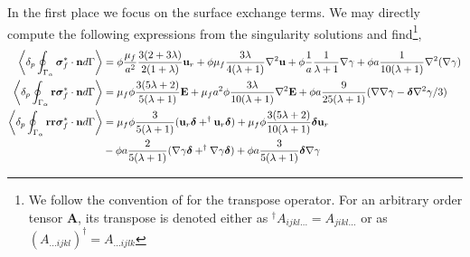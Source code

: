 In the first place we focus on the surface exchange terms. 
We may directly compute the following expressions from the singularity solutions and find\footnote{
    We follow the convention of \citet{happel2012low} for the transpose operator.
    For an arbitrary order tensor \textbf{A}, its transpose is denoted either as $^\dagger A_{ijkl\ldots} = A_{jikl\ldots}$ or as $ (A_{\ldots ijkl})^\dagger = A_{\ldots ijlk}$}, 
\begin{align}
    \pSavg{\bm\sigma_f^*\cdot \textbf{n}} &
    =
    \phi
    \frac{\mu_f}{a^2}
    \frac{3(2+3\lambda)}{2(1+\lambda)}\textbf{u}_r
    + \phi\mu_f  \frac{3\lambda}{4(\lambda +1)} \grad^2 \textbf{u}%
    + \phi \frac{1}{a}\frac{1}{\lambda +1} \grad \gamma
    + \phi a \frac{1}{10(\lambda +1)}\grad^2(\grad\gamma)
    \label{eq:drag_forces}
    \\
    \pSavg{\textbf{r}\bm\sigma_f^*\cdot \textbf{n}} &
    = \mu_f \phi 
    \frac{3(5\lambda +2)}{5(\lambda +1)}\textbf{E}
    + \mu_f a^2 \phi \frac{3\lambda}{10(\lambda+1)}\grad^2  \textbf{E}
    + \phi a \frac{9}{25(\lambda +1)}(\grad\grad \gamma- \bm\delta\grad^2 \gamma/3)
    \\
    \pSavg{\textbf{rr}\bm\sigma_f^*\cdot \textbf{n}} &
    =
    \mu_f \phi \frac{3}{5(\lambda +1)} (\textbf{u}_r \bm\delta + ^\dagger\textbf{u}_r\bm\delta )
    + \mu_f \phi \frac{3(5\lambda +2)}{10(\lambda+1)}\bm\delta \textbf{u}_r\nonumber\\
    &
    - \phi a\frac{2}{5(\lambda+1)}(\grad \gamma \bm\delta+  ^\dagger \grad \gamma\bm\delta)
    + \phi a\frac{3}{5(\lambda+1)} \bm\delta \grad \gamma
\end{align}
